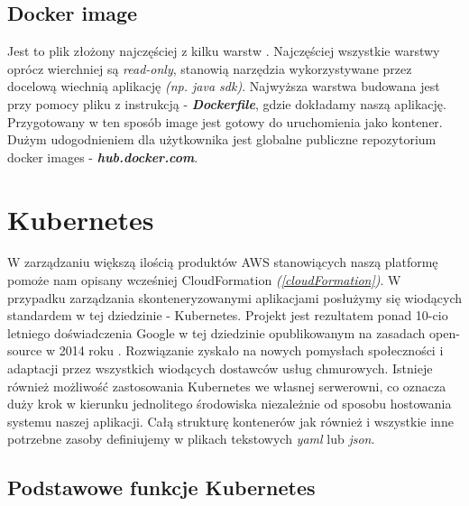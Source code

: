 \subsection{Docker image}
Jest to plik złożony najczęściej z kilku warstw \cite{docker-doc}. 
Najczęściej wszystkie warstwy oprócz wierchniej są \emph{read-only}, stanowią narzędzia wykorzystywane przez docelową wiechnią aplikację \emph{(np. java sdk)}.
Najwyższa warstwa budowana jest przy pomocy pliku z instrukcją - \emph{\textbf{Dockerfile}}, gdzie dokładamy naszą aplikację.
Przygotowany w ten sposób image jest gotowy do uruchomienia jako kontener. Dużym udogodnieniem dla użytkownika jest globalne publiczne repozytorium docker images - \emph{\textbf{hub.docker.com}}.


\section{Kubernetes}
W zarządzaniu większą ilością produktów AWS stanowiących naszą platformę pomoże nam opisany wcześniej CloudFormation \emph{(\ref{cloudFormation})}. 
W przypadku zarządzania skonteneryzowanymi aplikacjami posłużymy się wiodących standardem w tej dziedzinie - Kubernetes.
Projekt jest rezultatem ponad 10-cio letniego doświadczenia Google w tej dziedzinie opublikowanym na zasadach open-source w 2014 roku \cite{k8s-what}.
Rozwiązanie zyskało na nowych pomysłach społeczności i adaptacji przez wszystkich wiodących dostawców usług chmurowych.
Istnieje również możliwość zastosowania Kubernetes we własnej serwerowni, 
co oznacza duży krok w kierunku jednolitego środowiska niezależnie od sposobu hostowania systemu naszej aplikacji.
Całą strukturę kontenerów jak również i wszystkie inne potrzebne zasoby definiujemy w plikach tekstowych {\em yaml} lub {\em json}.

\subsection{Podstawowe funkcje Kubernetes}

